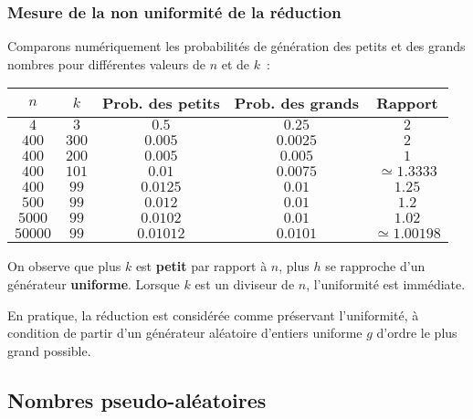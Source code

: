 \begin{frame}[fragile]
\frametitle{Mesure de la non uniformité de la réduction}
Comparons numériquement les probabilités de génération des petits et des
grands nombres pour différentes valeurs de $n$ et de $k$~:
\begin{center}
    \footnotesize
    \begin{tabular}{c|c||c|c|c}
        $n$ & $k$ & Prob. des petits & Prob. des grands & Rapport \\ \hline \hline
        $4$ & $3$ & $0.5$ & $0.25$ & $2$ \\
        $400$ & $300$ & $0.005$ & $0.0025$ & $2$ \\
        $400$ & $200$ & $0.005$ & $0.005$ & $1$ \\
        $400$ & $101$ & $0.01$ & $0.0075$ & $\simeq1.3333$ \\
        $400$ & $99$ & $0.0125$ & $0.01$ & $1.25$ \\
        $500$ & $99$ & $0.012$ & $0.01$ & $1.2$ \\
        $5000$ & $99$ & $0.0102$ & $0.01$ & $1.02$ \\
        $50000$ & $99$ & $0.01012$ & $0.0101$ & $\simeq1.00198$
    \end{tabular}
\end{center}

On observe que plus $k$ est {\bf petit} par rapport à $n$, plus $h$ se
rapproche d'un générateur {\bf uniforme}. Lorsque $k$ est un diviseur
de $n$, l'uniformité est immédiate.
\medskip

En pratique, la réduction est considérée comme préservant l'uniformité,
à condition de partir d'un générateur aléatoire d'entiers uniforme $g$
d'ordre le  plus grand possible.
\end{frame}

\subsection{Nombres pseudo-aléatoires}

